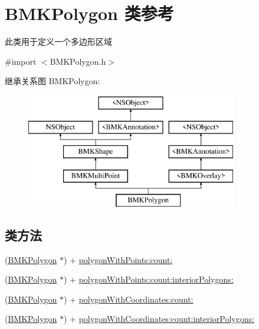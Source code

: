 \hypertarget{interface_b_m_k_polygon}{\section{B\-M\-K\-Polygon 类参考}
\label{interface_b_m_k_polygon}
}


此类用于定义一个多边形区域  




{\ttfamily \#import $<$B\-M\-K\-Polygon.\-h$>$}

继承关系图 B\-M\-K\-Polygon\-:\begin{figure}[H]
\begin{center}
\leavevmode
\includegraphics[height=5.000000cm]{interface_b_m_k_polygon}
\end{center}
\end{figure}
\subsection*{类方法}
\begin{DoxyCompactItemize}
\item 
(\hyperlink{interface_b_m_k_polygon}{B\-M\-K\-Polygon} $\ast$) + \hyperlink{interface_b_m_k_polygon_a74b92a200709fb4c6718b26ebdfcc50a}{polygon\-With\-Points\-:count\-:}
\item 
(\hyperlink{interface_b_m_k_polygon}{B\-M\-K\-Polygon} $\ast$) + \hyperlink{interface_b_m_k_polygon_aa4d03b7361ffc6b93721d456e62b14b0}{polygon\-With\-Points\-:count\-:interior\-Polygons\-:}
\item 
(\hyperlink{interface_b_m_k_polygon}{B\-M\-K\-Polygon} $\ast$) + \hyperlink{interface_b_m_k_polygon_aa3de0deeba040969c9211b64c59831f2}{polygon\-With\-Coordinates\-:count\-:}
\item 
(\hyperlink{interface_b_m_k_polygon}{B\-M\-K\-Polygon} $\ast$) + \hyperlink{interface_b_m_k_polygon_a298e0f0578320ab5419a9e150ffc0714}{polygon\-With\-Coordinates\-:count\-:interior\-Polygons\-:}
\end{DoxyCompactItemize}
